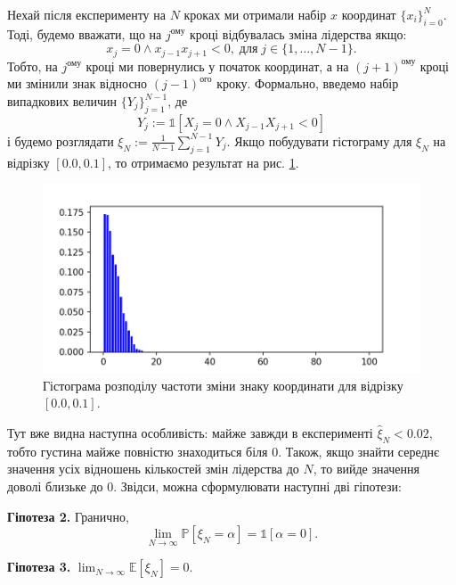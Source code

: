 \documentclass[14pt]{extarticle}
\begin{document}
Нехай після експерименту на $N$ кроках ми отримали набір $x$ координат $\{x_i\}_{i=0}^N$. Тоді, будемо вважати, що на $j^{\text{ому}}$ кроці відбувалась зміна лідерства якщо:
\begin{equation}
    x_j = 0 \wedge x_{j-1}x_{j+1} < 0, \; \text{для} \; j \in \{1,\dots,N-1\}.
\end{equation}
Тобто, на $j^{\text{ому}}$ кроці ми повернулись у початок координат, а на $(j+1)^{\text{ому}}$ кроці ми змінили знак відносно $(j-1)^{\text{ого}}$ кроку. Формально, введемо набір випадкових величин $\{Y_j\}_{j=1}^{N-1}$, де
\begin{equation}
    Y_j := \mathds{1}\left[X_j=0 \wedge X_{j-1}X_{j+1} < 0\right]
\end{equation}
і будемо розглядати $\xi_N := \frac{1}{N-1}\sum_{j=1}^{N-1}Y_j$. Якщо побудувати гістограму для $\xi_N$ на відрізку $[0.0,0.1]$, то отримаємо результат на рис. \ref{fig:histogram_2}.
\begin{figure}
    \centering
    \includegraphics[width=\textwidth]{images/hw_2/switches_number_experiment.png}
    \caption{Гістограма розподілу частоти зміни знаку координати для відрізку $[0.0,0.1]$.}
    \label{fig:histogram_2}
\end{figure}

Тут вже видна наступна особливість: майже завжди в експерименті $\hat{\xi}_N < 0.02$, тобто густина майже повністю знаходиться біля $0$. Також, якщо знайти середнє значення усіх відношень кількостей змін лідерства до $N$, то вийде значення доволі близьке до $0$. Звідси, можна сформулювати наступні дві гіпотези:

\textbf{Гіпотеза 2.} Гранично,
\begin{equation}
    \lim_{N \to \infty}\mathbb{P}[\xi_N=\alpha] = \mathds{1}[\alpha=0].
\end{equation}

\textbf{Гіпотеза 3.} $\lim_{N \to \infty}\mathbb{E}[\xi_N] = 0$.
\end{document}
